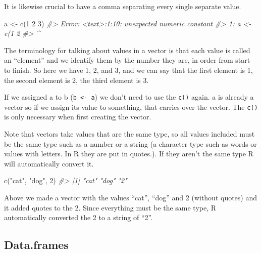 \documentclass[
]{krantz}
\makeatletter
\newenvironment{Shaded}{\begin{snugshade}}{\end{snugshade}}
\newcommand{\CommentTok}[1]{\textcolor[rgb]{0.37,0.37,0.37}{\textit{#1}}}
\newcommand{\DecValTok}[1]{\textcolor[rgb]{0.06,0.06,0.06}{#1}}
\newcommand{\FunctionTok}[1]{\textcolor[rgb]{0,0,0}{#1}}
\newcommand{\NormalTok}[1]{#1}
\newcommand{\OtherTok}[1]{\textcolor[rgb]{0.37,0.37,0.37}{#1}}
\newcommand{\StringTok}[1]{\textcolor[rgb]{0.5,0.5,0.5}{#1}}
\newenvironment{kframe}{%
\medskip{}
\setlength{\fboxsep}{.8em}
 \def\at@end@of@kframe{}%
 \ifinner\ifhmode%
  \def\at@end@of@kframe{\end{minipage}}%
  \begin{minipage}{\columnwidth}%
 \fi\fi%
 \def\FrameCommand##1{\hskip\@totalleftmargin \hskip-\fboxsep
 \colorbox{shadecolor}{##1}\hskip-\fboxsep
     \hskip-\linewidth \hskip-\@totalleftmargin \hskip\columnwidth}%
 \MakeFramed {\advance\hsize-\width
   \@totalleftmargin\z@ \linewidth\hsize
   \@setminipage}}%
 {\par\unskip\endMakeFramed%
 \at@end@of@kframe}
\renewenvironment{Shaded}{\begin{kframe}}{\end{kframe}}
\makeatother
\begin{document}
It is likewise crucial to have a comma separating every single separate value.

\begin{Shaded}
\begin{Highlighting}[]
\NormalTok{a }\OtherTok{\textless{}{-}} \FunctionTok{c}\NormalTok{(}\DecValTok{1} \DecValTok{2} \DecValTok{3}\NormalTok{)}
\CommentTok{\#\textgreater{} Error: \textless{}text\textgreater{}:1:10: unexpected numeric constant}
\CommentTok{\#\textgreater{} 1: a \textless{}{-} c(1 2}
\CommentTok{\#\textgreater{}              \^{}}
\end{Highlighting}
\end{Shaded}

The terminology for talking about values in a vector is that each value is called an ``element'' and we identify them by the number they are, in order from start to finish. So here we have 1, 2, and 3, and we can say that the first element is 1, the second element is 2, the third element is 3.

If we assigned a to b (\texttt{b\ \textless{}-\ a}) we don't need to use the \texttt{c()} again. a is already a vector so if we assign its value to something, that carries over the vector. The \texttt{c()} is only necessary when first creating the vector.

Note that vectors take values that are the same type, so all values included must be the same type such as a number or a string (a character type such as words or values with letters. In R they are put in quotes.). If they aren't the same type R will automatically convert it.

\begin{Shaded}
\begin{Highlighting}[]
\FunctionTok{c}\NormalTok{(}\StringTok{"cat"}\NormalTok{, }\StringTok{"dog"}\NormalTok{, }\DecValTok{2}\NormalTok{)}
\CommentTok{\#\textgreater{} [1] "cat" "dog" "2"}
\end{Highlighting}
\end{Shaded}

Above we made a vector with the values ``cat'', ``dog'' and 2 (without quotes) and it added quotes to the 2. Since everything must be the same type, R automatically converted the 2 to a string of ``2''.

\hypertarget{data.frames}{%
\subsection{Data.frames}\label{data.frames}}
\end{document}

